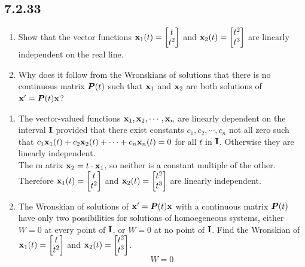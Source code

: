 \documentclass{article}
\begin{document}
\subsection{7.2.33}

\begin{enumerate}[label = \textbf{(\alph*)}]
	\item Show that the vector functions $ \vect{x}_1(t) = \begin{bmatrix} t \\ t^2 \end{bmatrix} $ and $ \vect{x}_2(t) = \begin{bmatrix} t^2 \\ t^3 \end{bmatrix} $ are linearly independent on the real line.
	\item Why does it follow from the Wronskians of solutions that there is no continuous matrix $ \matr{P}(t) $ such that $ \vect{x}_1 $ and $ \vect{x}_2 $ are both solutions of $ \vect{x}' = \matr{P}(t)\vect{x} $?
\end{enumerate}

\hr

\begin{enumerate}[label = \textbf{(\alph*)}]
	\item
		The vector-valued functions $ \vect{x}_1, \vect{x}_2, \cdots, \vect{x}_n $ are linearly dependent on the interval $ \vect{I} $ provided that there exist constants $ c_1, c_2, \cdots, c_n $ not all zero such that $ c_1\vect{x}_1(t) + c_2\vect{x}_2(t) + \cdots + c_n\vect{x}_n(t) = 0 $ for all $ t $ in $ \vect{I} $. Otherwise they are linearly independent. \\
		The m atrix $ \vect{x}_2 = t \cdot \vect{x}_1 $, so neither is a constant multiple of the other. Therefore $ \vect{x}_1(t) = \begin{bmatrix} t \\ t^2 \end{bmatrix} $ and $ \vect{x}_2(t) = \begin{bmatrix} t^2 \\ t^3 \end{bmatrix} $ are linearly independent.
	\item
		The Wronskian of solutions of $ \vect{x}' = \matr{P}(t)\vect{x} $ with a continuous matrix $ \matr{P}(t) $ have only two possibilities for solutions of homoegeneous systems, either $ W = 0 $ at every point of $ \vect{I} $, or $ W = 0 $ at no point of $ \vect{I} $. Find the Wronskian of $ \vect{x}_1(t) = \begin{bmatrix} t \\ t^2 \end{bmatrix} $ and $ \vect{x}_2(t) = \begin{bmatrix} t^2 \\ t^3 \end{bmatrix} $.
		\begin{equation*}
			W = 0
		\end{equation*}
\end{enumerate}
\end{document}
